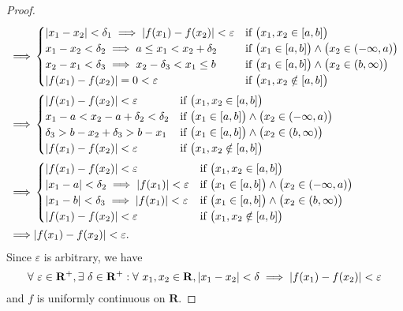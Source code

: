 \begin{proof}
\begin{align*}
        \implies & \begin{cases}
            \abs*{x_1 - x_2} < \delta_1 \implies \abs*{f(x_1) - f(x_2)} < \varepsilon & \text{if } \big(x_1, x_2 \in [a, b]\big)                                 \\
            x_1 - x_2 < \delta_2 \implies a \leq x_1 < x_2 + \delta_2                 & \text{if } \big(x_1 \in [a, b]\big) \land \big(x_2 \in (-\infty, a)\big) \\
            x_2 - x_1 < \delta_3 \implies x_2 - \delta_3 < x_1 \leq b                 & \text{if } \big(x_1 \in [a, b]\big) \land \big(x_2 \in (b, \infty)\big)  \\
            \abs*{f(x_1) - f(x_2)} = 0 < \varepsilon                                  & \text{if } \big(x_1, x_2 \notin [a, b]\big)
        \end{cases}                                  \\
        \implies & \begin{cases}
            \abs*{f(x_1) - f(x_2)} < \varepsilon    & \text{if } \big(x_1, x_2 \in [a, b]\big)                                 \\
            x_1 - a < x_2 - a + \delta_2 < \delta_2 & \text{if } \big(x_1 \in [a, b]\big) \land \big(x_2 \in (-\infty, a)\big) \\
            \delta_3 > b - x_2 + \delta_3 > b - x_1 & \text{if } \big(x_1 \in [a, b]\big) \land \big(x_2 \in (b, \infty)\big)  \\
            \abs*{f(x_1) - f(x_2)} < \varepsilon    & \text{if } \big(x_1, x_2 \notin [a, b]\big)
        \end{cases}                                  \\
        \implies & \begin{cases}
            \abs*{f(x_1) - f(x_2)} < \varepsilon                           & \text{if } \big(x_1, x_2 \in [a, b]\big)                                 \\
            \abs*{x_1 - a} < \delta_2 \implies \abs*{f(x_1)} < \varepsilon & \text{if } \big(x_1 \in [a, b]\big) \land \big(x_2 \in (-\infty, a)\big) \\
            \abs*{x_1 - b} < \delta_3 \implies \abs*{f(x_1)} < \varepsilon & \text{if } \big(x_1 \in [a, b]\big) \land \big(x_2 \in (b, \infty)\big)  \\
            \abs*{f(x_1) - f(x_2)} < \varepsilon                           & \text{if } \big(x_1, x_2 \notin [a, b]\big)
        \end{cases}                                  \\
        \implies & \abs*{f(x_1) - f(x_2)} < \varepsilon.
    \end{align*}
    Since \(\varepsilon\) is arbitrary, we have
    \[
        \forall\ \varepsilon \in \mathbf{R}^+, \exists\ \delta \in \mathbf{R}^+ : \forall\ x_1, x_2 \in \mathbf{R}, \abs*{x_1 - x_2} < \delta \implies \abs*{f(x_1) - f(x_2)} < \varepsilon
    \]
    and \(f\) is uniformly continuous on \(\mathbf{R}\).
\end{proof}

